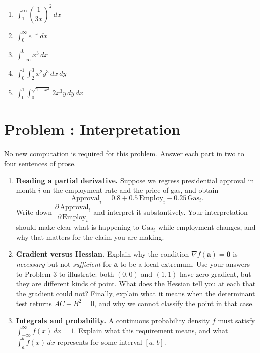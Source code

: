 \documentclass[11pt]{article}
\newcounter{problem}
\newcommand{\problem}[1]{\stepcounter{problem}\section*{Problem \theproblem: #1}}
\begin{document}
\begin{enumerate}[label=\alph*.]
\item $\int_1^{\infty} \left(\dfrac{1}{3x}\right)^2 \,dx$
\item $\int_0^{\infty} e^{-x} \,dx$
\item $\int_{-\infty}^0 x^3 \,dx$
\item $\int_{0}^1 \int_{2}^{3} x^2y^3 \,dx \,dy$
\item $\int_{0}^1 \int_0^{\sqrt{1-x^2}} 2x^3y \,dy \,dx$
\end{enumerate}

\problem{Interpretation}
No new computation is required for this problem. Answer each part in two to
four sentences of prose.

\begin{enumerate}[label=\alph*.]
\item \textbf{Reading a partial derivative.} Suppose we regress presidential
  approval in month $i$ on the employment rate and the price of gas, and
  obtain
  \[
    \text{Approval}_{i} = 0.8 + 0.5\,\text{Employ}_{i} - 0.25\,\text{Gas}_{i}.
  \]
  Write down $\dfrac{\partial\, \text{Approval}_{i}}{\partial\, \text{Employ}_{i}}$
  and interpret it substantively. Your interpretation should make clear what
  is happening to $\text{Gas}_{i}$ while employment changes, and why that
  matters for the claim you are making.

\item \textbf{Gradient versus Hessian.} Explain why the condition
  $\nabla f(\mathbf{a}) = \mathbf{0}$ is \emph{necessary} but not
  \emph{sufficient} for $\mathbf{a}$ to be a local extremum. Use your answers
  to Problem 3 to illustrate: both $(0,0)$ and $(1,1)$ have zero gradient,
  but they are different kinds of point. What does the Hessian tell you at
  each that the gradient could not? Finally, explain what it means when the
  determinant test returns $AC - B^2 = 0$, and why we cannot classify the
  point in that case.

\item \textbf{Integrals and probability.} A continuous probability density
  $f$ must satisfy $\int_{-\infty}^{\infty} f(x) \,dx = 1$. Explain what this
  requirement means, and what $\int_{a}^{b} f(x)\,dx$ represents for some
  interval $[a,b]$.
  \end{enumerate}


\end{document}
